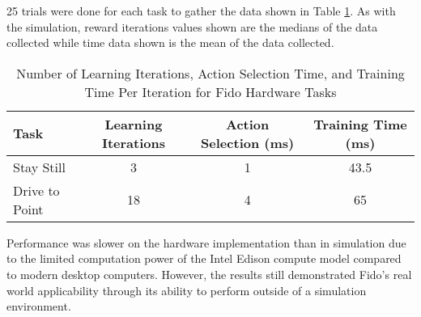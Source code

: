 25 trials were done for each task to gather the data shown in Table \ref{tab:data2}.
As with the simulation, reward iterations values shown are the medians of the data collected while time data shown is the mean of the data collected.

\begin{table}[ht]
	\centering
	\begin{tabular}{@{}lccc@{}}
		\toprule
		Task             & Learning Iterations & Action Selection (ms) & Training Time (ms) \\ \midrule
		Stay Still       & 3                   & 1                    & 43.5                  \\
		Drive to Point   & 18                  & 4                     & 65                  \\
	\end{tabular}
	\caption{Number of Learning Iterations, Action Selection Time, and Training Time Per Iteration for Fido Hardware Tasks}
	\label{tab:data2}
\end{table}

Performance was slower on the hardware implementation than in simulation due to the limited computation power of the Intel Edison compute model compared to modern desktop computers.
However, the results still demonstrated Fido's real world applicability through its ability to perform outside of a simulation environment.
